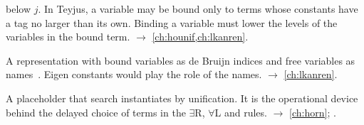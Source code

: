 \begin{glossarylist}
  below $j$. In Teyjus, a variable may be bound only to terms whose constants have a tag no larger than its own.
  Binding a variable must lower the levels of the variables in the bound term.
  $\rightarrow$ \cref{ch:hounif,ch:lkanren}.
\item[Locally nameless] A representation with bound variables as de Bruijn indices and free variables as
  names~\cite{McBrideMcKinna2004,Chargueraud2012}. Eigen constants would play the role of the names.
  $\rightarrow$ \cref{ch:lkanren}.
\item[Logic variable] A placeholder that search instantiates by unification. It is the operational device behind
  the delayed choice of terms in the $\exists$R, $\forall$L and  rules.
  $\rightarrow$ \cref{ch:horn}; .
\end{glossarylist}

